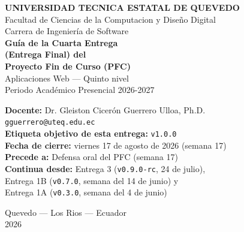 \documentclass[11pt,a4paper]{article}
\begin{document}
\begin{center}
    \vspace*{1.2cm}
    {\Large\bfseries\textcolor{uteqverde}{UNIVERSIDAD TECNICA ESTATAL DE QUEVEDO}}\\[4pt]
    {\large Facultad de Ciencias de la Computacion y Dise\~{n}o Digital}\\[2pt]
    {\large Carrera de Ingenier\'{i}a de Software}\\[24pt]

    {\LARGE\bfseries Gu\'{i}a de la Cuarta Entrega}\\[4pt]
    {\LARGE\bfseries (Entrega Final) del}\\[4pt]
    {\LARGE\bfseries Proyecto Fin de Curso (PFC)}\\[16pt]

    {\large Aplicaciones Web --- Quinto nivel}\\[2pt]
    {\large Periodo Acad\'{e}mico Presencial 2026-2027}\\[22pt]

    \begin{tcolorbox}[colback=uteqverde!8,colframe=uteqverde,arc=3pt,
                      width=0.88\textwidth,boxrule=0.8pt]
        \centering
        \textbf{Docente:} Dr. Gleiston Cicer\'on Guerrero Ulloa, Ph.D.\\[2pt]
        \texttt{gguerrero@uteq.edu.ec}\\[6pt]
        \textbf{Etiqueta objetivo de esta entrega:} \texttt{v1.0.0}\\[2pt]
        \textbf{Fecha de cierre:} viernes 17 de agosto de 2026 (semana 17)\\[2pt]
        \textbf{Precede a:} Defensa oral del PFC (semana 17)\\[2pt]
        \textbf{Continua desde:} Entrega 3 (\texttt{v0.9.0-rc}, 24 de julio),\\ Entrega 1B (\texttt{v0.7.0}, semana del 14 de junio) y\\ Entrega 1A (\texttt{v0.3.0}, semana del 4 de junio)
    \end{tcolorbox}

    \vfill

    {\small Quevedo --- Los Rios --- Ecuador}\\[2pt]
    {\small 2026}
\end{center}

\newpage
\end{document}
